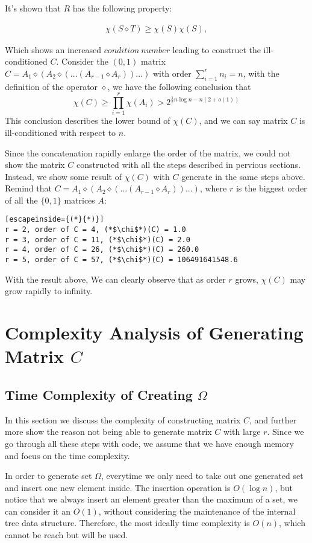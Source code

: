 \documentclass[11pt]{article}
\begin{document}
It's shown that $R$ has the following property:

\begin{align*}
\chi(S \diamond T) \geq \chi(S)\chi(S),
\end{align*}

Which shows an increased $condition\ number$ leading to construct the ill-conditioned $C$. Consider the $(0, 1)$ matrix $C = A_1 \diamond (A_2 \diamond (. . . (A_{r-1} \diamond A_r))...)$ with order $\sum_{i=1}^rn_i=n$, with the definition of the operator $\diamond$, we have the following conclusion that
$$\chi(C)\geq \prod_{i=1}^r\chi(A_i) > 2^{\frac{1}{2}n\log n-n(2+o(1))}$$
This conclusion describes the lower bound of $\chi(C)$, and we can say matrix $C$ is ill-conditioned with respect to $n$.

Since the concatenation rapidly enlarge the order of the matrix, we could not show the matrix $C$ constructed with all the steps described in pervious sections. Instead, we show some result of $\chi(C)$ with $C$ generate in the same steps above. Remind that $C = A_1 \diamond (A_2 \diamond (. . . (A_{r-1} \diamond A_r))...)$, where $r$ is the biggest order of all the $\{0, 1\}$ matrices $A$:

\begin{lstlisting}[escapeinside={(*}{*)}]
r = 2, order of C = 4, (*$\chi$*)(C) = 1.0
r = 3, order of C = 11, (*$\chi$*)(C) = 2.0
r = 4, order of C = 26, (*$\chi$*)(C) = 260.0
r = 5, order of C = 57, (*$\chi$*)(C) = 106491641548.6
\end{lstlisting}

With the result above, We can clearly observe that as order $r$ grows, $\chi(C)$ may grow rapidly to infinity.

\section{Complexity Analysis of Generating Matrix $C$}
\subsection{Time Complexity of Creating $\Omega$}
In this section we discuss the complexity of constructing matrix $C$, and further more show the reason not being able to generate matrix $C$ with large $r$. Since we go through all these steps with code, we assume that we have enough memory and focus on the time complexity.

In order to generate set $\Omega$, everytime we only need to take out one generated set and insert one new element inside. The insertion operation is $O(\log n)$, but notice that we always insert an element greater than the maximum of a set, we can consider it an $O(1)$, without considering the maintenance of the internal tree data structure. Therefore, the most ideally time complexity is $O(n)$, which cannot be reach but will be used.
\end{document}
